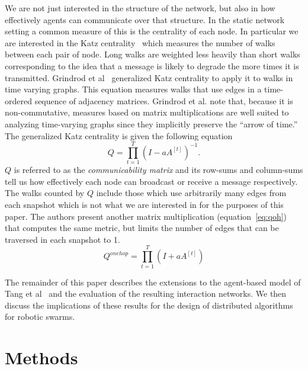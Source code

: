 \documentclass[conference]{IEEEtran}
\newcommand{\adj}[1]{A^{[#1]}}
\begin{document}
We are not just interested in the structure of the network, but also
in how effectively agents can communicate over that structure. In the
static network setting a common measure of this is the centrality of
each node. In particular we are interested in the Katz
centrality~\cite{Newman2010} which measures the number of walks
between each pair of node. Long walks are weighted less heavily than
short walks corresponding to the idea that a message is likely to
degrade the more times it is transmitted. Grindrod et
al~\cite{Grindrod2011} generalized Katz centrality to apply it to
walks in time varying graphs. This equation measures walks that use
edges in a time-ordered sequence of adjacency matrices. Grindrod et
al. note that, because it is non-commutative, measures based on matrix
multiplications are well suited to analyzing time-varying graphs since
they implicitly preserve the ``arrow of time.'' The generalized Katz
centrality is given the following equation
\begin{equation}
  Q = \prod_{t = 1}^T(I - a\adj{t})^{-1}.
  \label{eq:q}
\end{equation}
$Q$ is referred to as the \emph{communicability matrix} and its
row-sums and column-sums tell us how effectively each node can
broadcast or receive a message respectively. The walks counted by $Q$
include those which use arbitrarily many edges from each snapshot
which is not what we are interested in for the purposes of this
paper. The authors present another matrix multiplication
(equation~\ref{eq:qoh}) that computes the same metric, but limits the
number of edges that can be traversed in each snapshot to 1.
\begin{equation}
  Q^{onehop} = \prod_{t = 1}^T(I + a\adj{t})
  \label{eq:qoh}
\end{equation}

The remainder of this paper describes the extensions to the
agent-based model of Tang et al~\cite{Tang2010} and the evaluation of
the resulting interaction networks. We then discuss the implications
of these results for the design of distributed algorithms for robotic
swarms.

\section{Methods}
\label{sec:methods}
\end{document}

